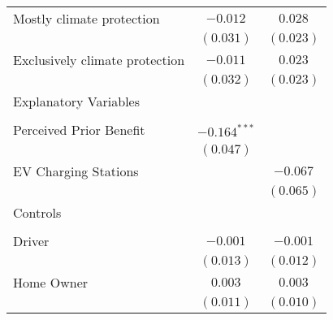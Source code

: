 \begin{center}
\begin{tiny}
\begin{longtable}{l@{} c@{} c@{}}
\quad Mostly climate protection                                                      & $-0.012$         & $0.028$          \\
                                                                                     & $(0.031)$        & $(0.023)$        \\
\quad Exclusively climate protection                                                 & $-0.011$         & $0.023$          \\
                                                                                     & $(0.032)$        & $(0.023)$        \\
Explanatory Variables                                                                &                  &                  \\
                                                                                     &                  &                  \\
\quad Perceived Prior Benefit                                                        & $-0.164^{***}$   &                  \\
                                                                                     & $(0.047)$        &                  \\
\quad EV Charging Stations                                                           &                  & $-0.067$         \\
                                                                                     &                  & $(0.065)$        \\
Controls                                                                             &                  &                  \\
                                                                                     &                  &                  \\
\quad Driver                                                                         & $-0.001$         & $-0.001$         \\
                                                                                     & $(0.013)$        & $(0.012)$        \\
\quad Home Owner                                                                     & $0.003$          & $0.003$          \\
                                                                                     & $(0.011)$        & $(0.010)$        \\

\end{longtable}
\end{tiny}
\end{center}
